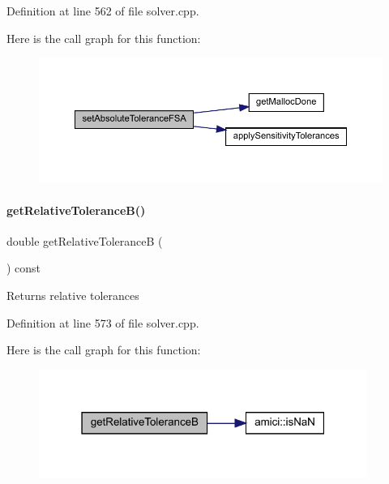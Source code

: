 Definition at line 562 of file solver.\+cpp.

Here is the call graph for this function\+:
\nopagebreak
\begin{figure}[H]
\begin{center}
\leavevmode
\includegraphics[width=350pt]{classamici_1_1_solver_a96ccd686d0ce5c2c43071537e088e42a_cgraph}
\end{center}
\end{figure}
\mbox{\label{classamici_1_1_solver_ae62749d65b73e317be96b0556401f29d}} 
\paragraph{\texorpdfstring{getRelativeToleranceB()}{getRelativeToleranceB()}}
{\footnotesize\ttfamily double get\+Relative\+ToleranceB (\begin{DoxyParamCaption}{ }\end{DoxyParamCaption}) const}

\begin{DoxyReturn}{Returns}
relative tolerances 
\end{DoxyReturn}


Definition at line 573 of file solver.\+cpp.

Here is the call graph for this function\+:
\nopagebreak
\begin{figure}[H]
\begin{center}
\leavevmode
\includegraphics[width=304pt]{classamici_1_1_solver_ae62749d65b73e317be96b0556401f29d_cgraph}
\end{center}
\end{figure}
\mbox{\label{classamici_1_1_solver_a63eaa8593d16c31cedbbd038925eff2d}} 
